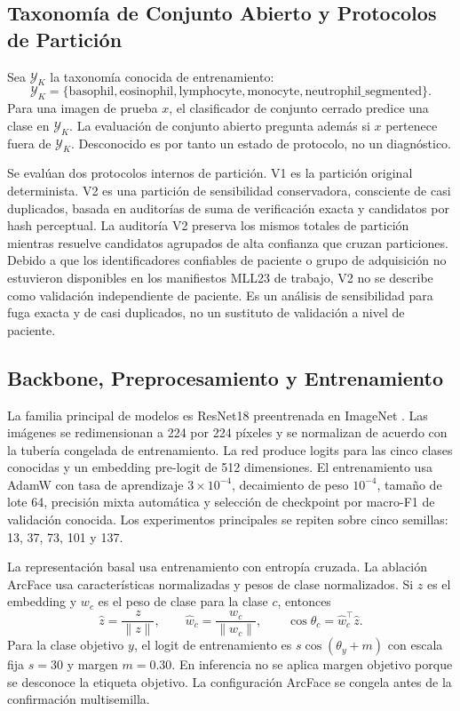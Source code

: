 \documentclass[11pt]{article}
\begin{document}
\subsection{Taxonomía de Conjunto Abierto y Protocolos de Partición}

Sea $\mathcal{Y}_K$ la taxonomía conocida de entrenamiento:
\[
\mathcal{Y}_K = \{\text{basophil}, \text{eosinophil}, \text{lymphocyte}, \text{monocyte}, \text{neutrophil\_segmented}\}.
\]
Para una imagen de prueba $x$, el clasificador de conjunto cerrado predice una clase en $\mathcal{Y}_K$. La evaluación de conjunto abierto pregunta además si $x$ pertenece fuera de $\mathcal{Y}_K$. Desconocido es por tanto un estado de protocolo, no un diagnóstico.

Se evalúan dos protocolos internos de partición. V1 es la partición original determinista. V2 es una partición de sensibilidad conservadora, consciente de casi duplicados, basada en auditorías de suma de verificación exacta y candidatos por hash perceptual. La auditoría V2 preserva los mismos totales de partición mientras resuelve candidatos agrupados de alta confianza que cruzan particiones. Debido a que los identificadores confiables de paciente o grupo de adquisición no estuvieron disponibles en los manifiestos MLL23 de trabajo, V2 no se describe como validación independiente de paciente. Es un análisis de sensibilidad para fuga exacta y de casi duplicados, no un sustituto de validación a nivel de paciente.

\subsection{Backbone, Preprocesamiento y Entrenamiento}

La familia principal de modelos es ResNet18 preentrenada en ImageNet \cite{he2016_resnet}. Las imágenes se redimensionan a 224 por 224 píxeles y se normalizan de acuerdo con la tubería congelada de entrenamiento. La red produce logits para las cinco clases conocidas y un embedding pre-logit de 512 dimensiones. El entrenamiento usa AdamW con tasa de aprendizaje $3\times10^{-4}$, decaimiento de peso $10^{-4}$, tamaño de lote 64, precisión mixta automática y selección de checkpoint por macro-F1 de validación conocida. Los experimentos principales se repiten sobre cinco semillas: 13, 37, 73, 101 y 137.

La representación basal usa entrenamiento con entropía cruzada. La ablación ArcFace usa características normalizadas y pesos de clase normalizados. Si $z$ es el embedding y $w_c$ es el peso de clase para la clase $c$, entonces
\[
\hat{z}=\frac{z}{\lVert z\rVert}, \qquad
\hat{w}_c=\frac{w_c}{\lVert w_c\rVert}, \qquad
\cos\theta_c=\hat{w}_c^\top \hat{z}.
\]
Para la clase objetivo $y$, el logit de entrenamiento es $s\cos(\theta_y+m)$ con escala fija $s=30$ y margen $m=0.30$. En inferencia no se aplica margen objetivo porque se desconoce la etiqueta objetivo. La configuración ArcFace se congela antes de la confirmación multisemilla.
\end{document}
